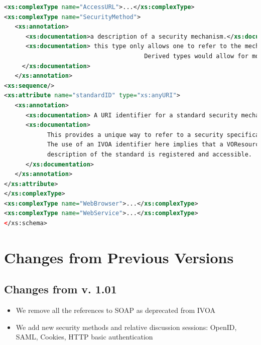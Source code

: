 \documentclass[11pt,a4paper]{ivoa}
\begin{document}
\begin{lstlisting}[language=xml,basicstyle=\footnotesize]
<xs:complexType name="AccessURL">...</xs:complexType>
<xs:complexType name="SecurityMethod">
   <xs:annotation>
      <xs:documentation>a description of a security mechanism.</xs:documentation>
      <xs:documentation> this type only allows one to refer to the mechanism via a URI.  
                                       Derived types would allow for more metadata.
     </xs:documentation>
   </xs:annotation>
<xs:sequence/>
<xs:attribute name="standardID" type="xs:anyURI">
   <xs:annotation>
      <xs:documentation> A URI identifier for a standard security mechanism. </xs:documentation>
      <xs:documentation>
            This provides a unique way to refer to a security specification standard. 
            The use of an IVOA identifier here implies that a VOResource 
            description of the standard is registered and accessible.
      </xs:documentation>
   </xs:annotation>
</xs:attribute>
</xs:complexType>
<xs:complexType name="WebBrowser">...</xs:complexType>
<xs:complexType name="WebService">...</xs:complexType>
</xs:schema>
\end{lstlisting}


\section{Changes from Previous Versions}

 
\subsection {Changes from v. 1.01}
\begin{itemize}
\item We remove all the references to SOAP as deprecated from IVOA
\item We add new security methods and relative discussion sessions: OpenID, SAML, Cookies, HTTP basic authentication
\end{itemize}



\end{document}
